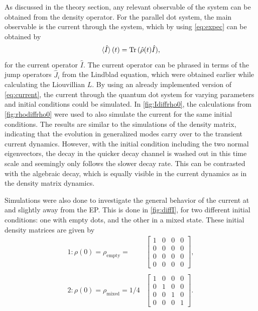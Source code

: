 \documentclass[../main.tex]{subfiles}
\begin{document}
As discussed in the theory section, any relevant observable of the system can be obtained from the density operator. For the parallel dot system, the main observable is the current through the system, which by using \cref{eq:expec} can be obtained by
\begin{equation}\label{eq:current}
    \braket{\hat I}(t) = \operatorname{Tr}{(\hat \rho(t)\hat I)},
\end{equation}
for the current operator $\hat I$. The current operator can be phrased in terms of the jump operators $\hat{J}_i$ from the Lindblad equation, which were obtained earlier while calculating the Liouvillian $L$. By using an already implemented version of \cref{eq:current}, the current through the quantum dot system for varying parameters and initial conditions could be simulated. In \cref{fig:Idiffrho0}, the calculations from \cref{fig:rhodiffrho0} were used to also simulate the current for the same initial conditions. The results are similar to the simulations of the density matrix, indicating that the evolution in generalized modes carry over to the transient current dynamics. However, with the initial condition including the two normal eigenvectors, the decay in the quicker decay channel is washed out in this time scale and seemingly only follows the slower decay rate. This can be contrasted with the algebraic decay, which is equally visible in the current dynamics as in the density matrix dynamics.


Simulations were also done to investigate the general behavior of the current at and slightly away from the EP. This is done in \cref{fig:diffI}, for two different initial conditions: one with empty dots, and the other in a mixed state. These initial density matrices are given by
\begin{equation}\label{eq:initialI}
\begin{split}
    1: \rho(0) = \rho_\text{empty} = &\begin{bmatrix} 1 & 0 & 0 & 0 \\
                                             0 & 0 & 0 & 0 \\
                                             0 & 0 & 0 & 0 \\
                                         0 & 0 & 0 & 0 \end{bmatrix},\\ \\
        2: \rho(0) = \rho_\text{mixed} = 1/4 &\begin{bmatrix} 1 & 0 & 0 & 0 \\
                                             0 & 1 & 0 & 0 \\
                                             0 & 0 & 1 & 0 \\
                                            0 & 0 & 0 & 1 \end{bmatrix}.
\end{split}
\end{equation}
\end{document}
